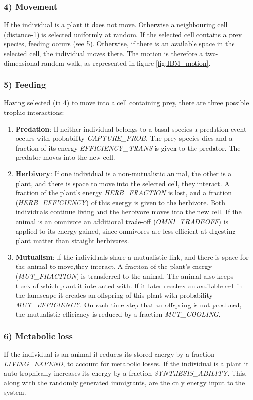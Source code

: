 \subsubsection*{4) Movement}
If the individual is a plant it does not move. Otherwise a neighbouring cell (distance-1) is selected uniformly at random. If the selected cell contains a prey species, feeding occurs (see 5). Otherwise, if there is an available space in the selected cell, the individual moves there. The motion is therefore a two-dimensional random walk, as represented in figure \ref{fig:IBM_motion}.
\subsubsection*{5) Feeding}
Having selected (in 4) to move into a cell containing prey, there are three possible trophic interactions:

\begin{enumerate}
	\item \textbf{Predation}: If neither individual belongs to a basal species a predation event occurs with probability \emph{CAPTURE\_PROB}. The prey species dies and a fraction of its energy \emph{EFFICIENCY\_TRANS} is given to the predator. The predator moves into the new cell.
	\item \textbf{Herbivory}: If one individual is a non-mutualistic animal, the other is a plant, and there is space to move into the selected cell, they interact. A fraction of the plant's energy \emph{HERB\_FRACTION} is lost, and a fraction (\emph{HERB\_EFFICIENCY}) of this energy is given to the herbivore. Both individuals continue living and the herbivore moves into the new cell. If the animal is an omnivore an additional trade-off (\emph{OMNI\_TRADEOFF}) is applied to its energy gained, since omnivores are less efficient at digesting plant matter than straight herbivores.   
	\item \textbf{Mutualism}: If the individuals share a mutualistic link, and there is space for the animal to move,they interact. A fraction of the plant's energy (\emph{MUT\_FRACTION}) is transferred to the animal. The animal also keeps track of which plant it interacted with. If it later reaches an available cell in the landscape it creates an offspring of this plant with probability \emph{MUT\_EFFICIENCY}. On each time step that an offspring is not produced, the mutualistic efficiency is reduced by a fraction \emph{MUT\_COOLING}.  
\end{enumerate}  

\subsubsection*{6) Metabolic loss}
If the individual is an animal it reduces its stored energy by a fraction \emph{LIVING\_EXPEND}, to account for metabolic losses. If the individual is a plant it auto-trophically increases its energy by a fraction \emph{SYNTHESIS\_ABILITY}. This, along with the randomly generated immigrants, are the only energy input to the system.


